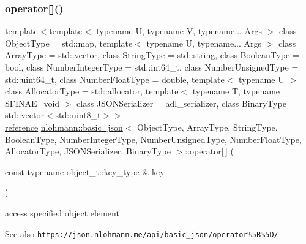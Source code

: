 \subsubsection{\texorpdfstring{operator[]()}{operator[]()}\hspace{0.1cm}{\footnotesize\ttfamily [3/8]}}
{\footnotesize\ttfamily template$<$template$<$ typename U, typename V, typename... Args $>$ class Object\+Type = std\+::map, template$<$ typename U, typename... Args $>$ class Array\+Type = std\+::vector, class String\+Type  = std\+::string, class Boolean\+Type  = bool, class Number\+Integer\+Type  = std\+::int64\+\_\+t, class Number\+Unsigned\+Type  = std\+::uint64\+\_\+t, class Number\+Float\+Type  = double, template$<$ typename U $>$ class Allocator\+Type = std\+::allocator, template$<$ typename T, typename S\+F\+I\+N\+A\+E=void $>$ class J\+S\+O\+N\+Serializer = adl\+\_\+serializer, class Binary\+Type  = std\+::vector$<$std\+::uint8\+\_\+t$>$$>$ \\
\hyperlink{classnlohmann_1_1basic__json_a220ae98554a76205fb7f8822d36b2d5a}{reference} \hyperlink{classnlohmann_1_1basic__json}{nlohmann\+::basic\+\_\+json}$<$ Object\+Type, Array\+Type, String\+Type, Boolean\+Type, Number\+Integer\+Type, Number\+Unsigned\+Type, Number\+Float\+Type, Allocator\+Type, J\+S\+O\+N\+Serializer, Binary\+Type $>$\+::operator\mbox{[}$\,$\mbox{]} (\begin{DoxyParamCaption}\item[{const typename object\+\_\+t\+::key\+\_\+type \&}]{key }\end{DoxyParamCaption})\hspace{0.3cm}{\ttfamily [inline]}}



access specified object element 

\begin{DoxySeeAlso}{See also}
\href{https://json.nlohmann.me/api/basic_json/operator%5B%5D/}{\tt https\+://json.\+nlohmann.\+me/api/basic\+\_\+json/operator\%5\+B\%5\+D/} 
\end{DoxySeeAlso}
\mbox{\label{classnlohmann_1_1basic__json_acb5b489310f4e0ce2d5fb29b73fb59d3}} 
